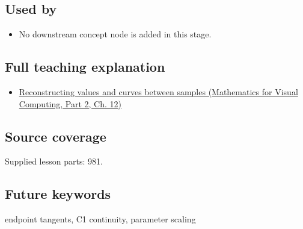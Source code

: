 \subsection{Used by}\label{appendix-db3aef8f2fd6-used-by}

\hypertarget{appendix-db3aef8f2fd6-used-by}{}

\begin{itemize}
\tightlist
\item
  No downstream concept node is added in this stage.
\end{itemize}

\subsection{Full teaching explanation}\label{appendix-db3aef8f2fd6-full-teaching-explanation}

\hypertarget{appendix-db3aef8f2fd6-full-teaching-explanation}{}

\begin{itemize}
\tightlist
\item
  \href{../02-Mathematics-for-Visual-Computing-P02/main.pdf\#02-foundations-ii-ch028-reconstructing-values-and-curves-between-samples}{Reconstructing values and curves between samples (Mathematics for Visual Computing, Part 2, Ch. 12)}
\end{itemize}

\subsection{Source coverage}\label{appendix-db3aef8f2fd6-source-coverage}

\hypertarget{appendix-db3aef8f2fd6-source-coverage}{}

Supplied lesson parts: 981.

\subsection{Future keywords}\label{appendix-db3aef8f2fd6-future-keywords}

\hypertarget{appendix-db3aef8f2fd6-future-keywords}{}

endpoint tangents, C1 continuity, parameter scaling
